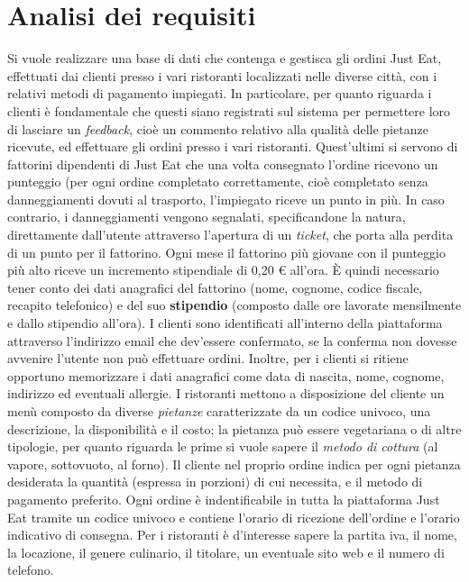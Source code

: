 \documentclass[10pt]{article}
\begin{document}
	\section{Analisi dei requisiti}
	Si vuole realizzare una base di dati che contenga e gestisca gli ordini Just Eat\texttrademark{}, effettuati dai clienti presso i vari ristoranti localizzati nelle diverse citt\`a, con i relativi metodi di pagamento impiegati. In particolare, per quanto riguarda i clienti \`e fondamentale che questi siano registrati sul sistema per permettere loro di lasciare un \textit{feedback}, cio\`e un commento relativo alla qualità delle pietanze ricevute, ed effettuare gli ordini presso i vari ristoranti. Quest'ultimi si servono di fattorini\footnotemark{} dipendenti di Just Eat\texttrademark{} che una volta consegnato l'ordine ricevono un punteggio (per ogni ordine completato correttamente, cio\`e completato senza danneggiamenti dovuti al trasporto, l'impiegato riceve un punto in più. In caso contrario, i danneggiamenti vengono segnalati, specificandone la natura, direttamente dall'utente attraverso l'apertura di un \textit{ticket}, che porta alla perdita di un punto per il fattorino. Ogni mese il fattorino più giovane con il punteggio più alto riceve un incremento stipendiale di 0,20 \euro{} all'ora. \`E quindi necessario tener conto dei dati anagrafici del fattorino (nome, cognome, codice fiscale, recapito telefonico) e del suo \textbf{stipendio} (composto dalle ore lavorate mensilmente e dallo stipendio all'ora). I clienti sono identificati all'interno della piattaforma attraverso l'indirizzo email che dev'essere confermato, se la conferma non dovesse avvenire l'utente non può effettuare ordini. Inoltre, per i clienti si ritiene opportuno memorizzare i dati anagrafici come data di nascita, nome, cognome, indirizzo ed eventuali allergie. I ristoranti mettono a disposizione del cliente un men\`u composto da diverse \textit{pietanze} caratterizzate da un codice univoco, una descrizione, la disponibilità e il costo; la pietanza può essere vegetariana o di altre tipologie, per quanto riguarda le prime si vuole sapere il \textit{metodo di cottura} (al vapore, sottovuoto, al forno). Il cliente nel proprio ordine indica per ogni pietanza desiderata la quantità (espressa in porzioni) di cui necessita, e il metodo di pagamento preferito. Ogni ordine \`e indentificabile in tutta la piattaforma Just Eat\texttrademark{} tramite un codice univoco e contiene l'orario di ricezione dell'ordine e l'orario indicativo di consegna. Per i ristoranti è d'interesse sapere la partita iva, il nome, la locazione, il genere culinario, il titolare, un eventuale sito web e il numero di telefono.
\end{document}
